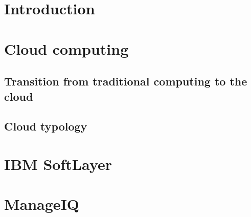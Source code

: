 
\chapter{Introduction}
\label{chap:Introduction}

\chapter{Cloud computing}
\label{chap:Cloud computing}
\section{Transition from traditional computing to the cloud}
\section{Cloud typology}

\chapter{IBM SoftLayer}
\label{chap:IBM SoftLayer}

\chapter{ManageIQ}
\label{chap:ManageIQ}
